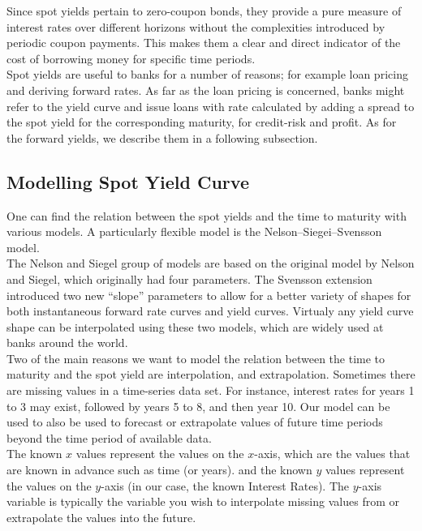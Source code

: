 \documentclass[11pt]{article}
\begin{document}
 Since spot yields pertain to zero-coupon bonds, they provide a pure measure of interest rates over different horizons without the complexities introduced by periodic coupon payments. This makes them a clear and direct indicator of the cost of borrowing money for specific time periods. \\
 
  Spot yields are useful to banks for a number of reasons; for example loan pricing and deriving forward rates. As far as the loan pricing is concerned, banks might refer to the yield curve and issue loans with rate calculated by adding a spread to the spot yield for the corresponding maturity, for credit-risk and profit. As for the forward yields, we describe them in a following subsection.


\subsection{Modelling Spot Yield Curve}

One can find the relation between the spot yields and the time to maturity with various models. A particularly flexible model is the  Nelson--Siegei--Svensson model. \\

The Nelson and Siegel group of models are based on the original model by Nelson and Siegel, which originally had four parameters. The Svensson extension introduced two new “slope” parameters to allow for a better variety of shapes for both instantaneous forward rate curves and yield curves.  Virtualy any yield curve shape can be interpolated using these two models, which are widely used at banks around the world.\\

Two of the main reasons we want to model the relation between the time to maturity and the spot yield are interpolation, and extrapolation.
Sometimes there are missing values in a time-series data set. For instance, interest rates for years 1 to 3 may exist, followed by years 5 to 8, and then year 10. Our model can be used to also be used to forecast or extrapolate values of future time periods beyond the time period of available data.\\

The known $x$ values represent the values on the $x$-axis, which are the values that are known in advance such as time (or years). and the known $y$ values represent the values on the $y$-axis (in our case, the known Interest Rates). The $y$-axis variable is typically the variable you wish to interpolate missing values from or extrapolate the values into the future.\\
\end{document}
